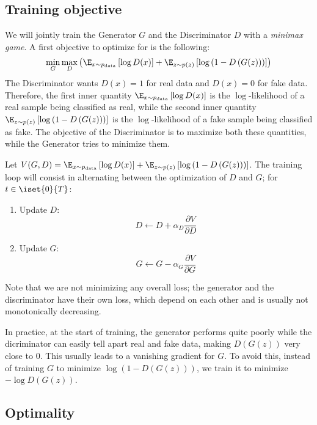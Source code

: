 \subsection{Training objective}
We will jointly train the Generator $G$ and the Discriminator $D$ with a \emph{minimax game}. A first objective to optimize for is the following:
\begin{equation}
    \min_G\max_D \left(
        \E_{x\sim p_{\text{data}}}\left[\log D(x)\right] + \E_{z\sim p(z)}\left[\log\left(1-D\left(G(z)\right)\right)\right]
    \right)
\end{equation}
The Discriminator wants $D(x)=1$ for real data and $D(x)=0$ for fake data. Therefore, the first inner quantity $\E_{x\sim p_{\text{data}}}\left[\log D(x)\right]$ is the $\log$-likelihood of a real sample being classified as real, while the second inner quantity $\E_{z\sim p(z)}\left[\log\left(1-D\left(G(z)\right)\right)\right]$ is the $\log$-likelihood of a fake sample being classified as fake. The objective of the Discriminator is to maximize both these quantities, while the Generator tries to minimize them.

Let $V(G, D) = \E_{x\sim p_{\text{data}}}\left[\log D(x)\right] + \E_{z\sim p(z)}\left[\log\left(1-D\left(G(z)\right)\right)\right]$. The training loop will consist in alternating between the optimization of $D$ and $G$; for $t\in\iset{0}{T}$:
\begin{enumerate}
    \item Update $D$: \begin{equation*}D\longleftarrow D+\alpha_D\frac{\partial V}{\partial D}\end{equation*}
    \item Update $G$: \begin{equation*}G\longleftarrow G-\alpha_G\frac{\partial V}{\partial G}\end{equation*}
\end{enumerate}
Note that we are not minimizing any overall loss; the generator and the discriminator have their own loss, which depend on each other and is usually not monotonically decreasing.

In practice, at the start of training, the generator performs quite poorly while the dicriminator can easily tell apart real and fake data, making $D(G(z))$ very close to $0$. This usually leads to a vanishing gradient for $G$. To avoid this, instead of training $G$ to minimize $\log\left(1-D(G(z))\right)$, we train it to minimize $-\log D(G(z))$.

\subsection{Optimality}


\newpage